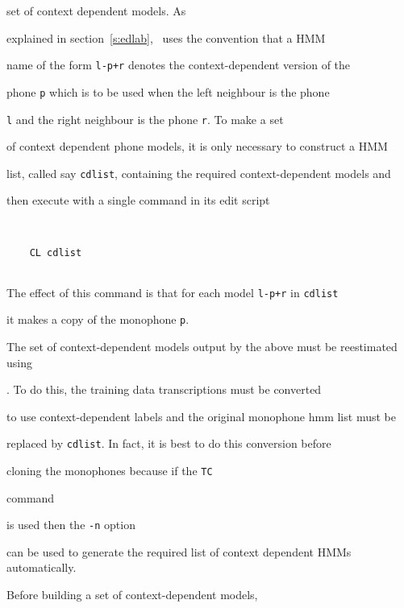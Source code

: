 set of context dependent models.  As


explained in section~\ref{s:edlab}, \HTK\ uses the convention that a HMM


name of the form \texttt{l-p+r} denotes the context-dependent version of the


phone \texttt{p} which is to be used when the left neighbour is the phone


\texttt{l} and the right neighbour is the phone \texttt{r}.  To make a set


of context dependent phone models, it is only necessary to construct a HMM


list, called say \texttt{cdlist}, containing the required context-dependent models  and


then execute  with a single command in its edit script


\begin{verbatim}


    CL cdlist


\end{verbatim}


The effect of this command is that for each model \texttt{l-p+r} in \texttt{cdlist}


it makes a copy of the monophone \texttt{p}.  







The set of context-dependent models output by the above must be reestimated using


.  To do this, the training data transcriptions must be converted


to use context-dependent labels and the original monophone hmm list must be


replaced by \texttt{cdlist}.  In fact, it is best to do this conversion before


cloning the monophones because if the  \texttt{TC} 


command 


is used then the \texttt{-n} option


can be used to generate the required list of context dependent HMMs automatically. 





Before building a set of context-dependent models,


